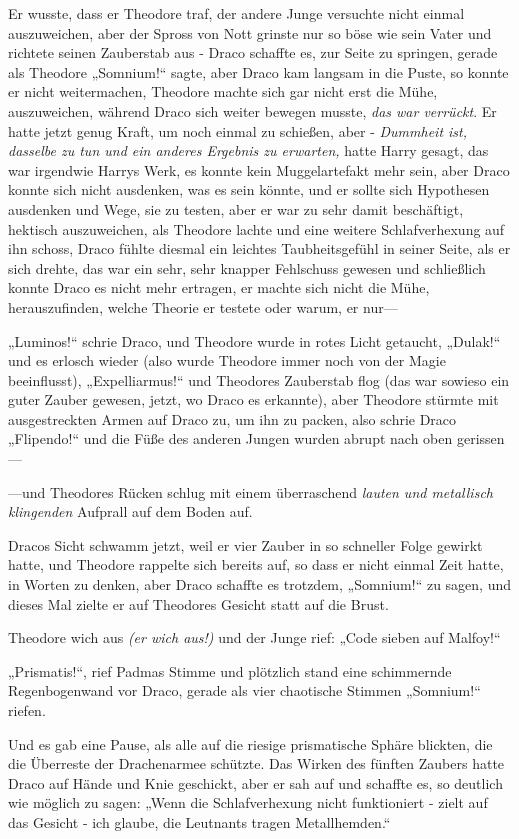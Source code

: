 {Er wusste, dass er Theodore traf, der andere Junge versuchte nicht einmal auszuweichen, aber der Spross von Nott grinste nur so böse wie sein Vater und richtete seinen Zauberstab aus - Draco schaffte es, zur Seite zu springen, gerade als Theodore „Somnium!“ sagte, aber Draco kam langsam in die Puste, so konnte er nicht weitermachen, Theodore machte sich gar nicht erst die Mühe, auszuweichen, während Draco sich weiter bewegen musste, \emph{das war verrückt}. Er hatte jetzt genug Kraft, um noch einmal zu schießen, aber - \emph{Dummheit ist, dasselbe zu tun und ein anderes Ergebnis zu erwarten,} hatte Harry gesagt, das war irgendwie Harrys Werk, es konnte kein Muggelartefakt mehr sein, aber Draco konnte sich nicht ausdenken, was es sein könnte, und er sollte sich Hypothesen ausdenken und Wege, sie zu testen, aber er war zu sehr damit beschäftigt, hektisch auszuweichen, als Theodore lachte und eine weitere Schlafverhexung auf ihn schoss, Draco fühlte diesmal ein leichtes Taubheitsgefühl in seiner Seite, als er sich drehte, das war ein sehr, sehr knapper Fehlschuss gewesen und schließlich konnte Draco es nicht mehr ertragen, er machte sich nicht die Mühe, herauszufinden, welche Theorie er testete oder warum, er nur—

„Luminos!“ schrie Draco, und Theodore wurde in rotes Licht getaucht, „Dulak!“ und es erlosch wieder (also wurde Theodore immer noch von der Magie beeinflusst), „Expelliarmus!“ und Theodores Zauberstab flog (das war sowieso ein guter Zauber gewesen, jetzt, wo Draco es erkannte), aber Theodore stürmte mit ausgestreckten Armen auf Draco zu, um ihn zu packen, also schrie Draco „Flipendo!“ und die Füße des anderen Jungen wurden abrupt nach oben gerissen—

—und Theodores Rücken schlug mit einem überraschend \emph{lauten und metallisch klingenden} Aufprall auf dem Boden auf.

Dracos Sicht schwamm jetzt, weil er vier Zauber in so schneller Folge gewirkt hatte, und Theodore rappelte sich bereits auf, so dass er nicht einmal Zeit hatte, in Worten zu denken, aber Draco schaffte es trotzdem, „Somnium!“ zu sagen, und dieses Mal zielte er auf Theodores Gesicht statt auf die Brust.

Theodore wich aus \emph{(er wich aus!)} und der Junge rief: „Code sieben auf Malfoy!“

„Prismatis!“, rief Padmas Stimme und plötzlich stand eine schimmernde Regenbogenwand vor Draco, gerade als vier chaotische Stimmen „Somnium!“ riefen.

Und es gab eine Pause, als alle auf die riesige prismatische Sphäre blickten, die die Überreste der Drachenarmee schützte. Das Wirken des fünften Zaubers hatte Draco auf Hände und Knie geschickt, aber er sah auf und schaffte es, so deutlich wie möglich zu sagen: „Wenn die Schlafverhexung nicht funktioniert - zielt auf das Gesicht - ich glaube, die Leutnants tragen Metallhemden.“

}
